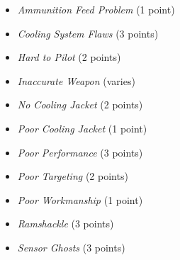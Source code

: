 
\begin{itemize}

  \item \emph{Ammunition Feed Problem} (1 point)

  \item \emph{Cooling System Flaws} (3 points)

  \item \emph{Hard to Pilot} (2 points)

  \item \emph{Inaccurate Weapon} (varies)

  \item \emph{No Cooling Jacket} (2 points)

  \item \emph{Poor Cooling Jacket} (1 point)

  \item \emph{Poor Performance} (3 points)

  \item \emph{Poor Targeting} (2 points)

  \item \emph{Poor Workmanship} (1 point)

  \item \emph{Ramshackle} (3 points)

  \item \emph{Sensor Ghosts} (3 points)


\end{itemize}

